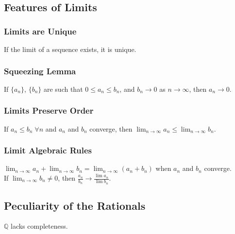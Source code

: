 \documentclass[11pt]{article}
\newcommand{\0}{\emptyset}
\newcommand{\Q}{\mathbb{Q}}
\begin{document}
\subsection*{Features of Limits}
\label{sec:orgbbbe21d}
\subsubsection*{Limits are Unique}
\label{sec:orga9ca25d}
If the limit of a sequence exists, it is unique.\\[0pt]
\subsubsection*{Squeezing Lemma}
\label{sec:org70a3287}
If \(\{a_{n}\}\), \(\{b_{n}\}\) are such that \(0\leq a_{n}\leq b_{n}\), and \(b_{n}\to0\) as \(n\to\infty\), then \(a_{n}\to0\).\\[0pt]
\subsubsection*{Limits Preserve Order}
\label{sec:org6927a9f}
If \(a_{n}\leq b_{n}\;\forall n\) and \(a_{n}\) and \(b_{n}\) converge, then \(\lim_{n\to\infty}a_{n}\leq\lim_{n\to\infty}b_{n}\).\\[0pt]
\subsubsection*{Limit Algebraic Rules}
\label{sec:org79e8f0d}
\(\lim_{n\to\infty}a_{n}+\lim_{n\to\infty}b_{n}=\lim_{n\to\infty}(a_{n}+b_{n})\) when \(a_{n}\) and \(b_{n}\) converge.\\[0pt]
If \(\lim_{n\to\infty}b_{n}\neq 0\), then \(\frac{a_{n}}{b_{n}} \to\frac{\lim a_{n}}{\lim b_{n}}\).\\[0pt]
\subsection*{Peculiarity of the Rationals}
\label{sec:org3cd0d34}
\(\Q\) lacks completeness.\\[0pt]
\end{document}
